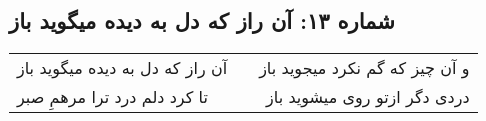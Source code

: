 \begin{center}
\section*{شماره ۱۳: آن راز که دل به دیده میگوید باز}
\label{sec:013}
\begin{longtable}{l p{0.5cm} r}
آن راز که دل به دیده میگوید باز
&&
و آن چیز که گم نکرد میجوید باز
\\
تا کرد دلم درد ترا مرهمِ صبر
&&
دردی دگر ازتو روی میشوید باز
\\
\end{longtable}
\end{center}
